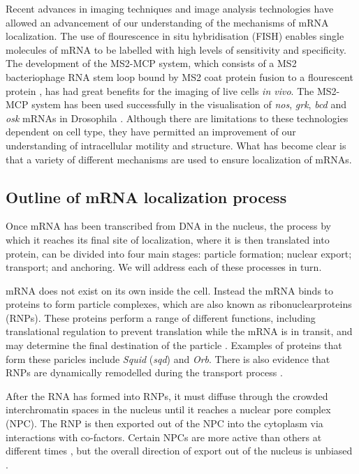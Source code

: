 \documentclass[twocolumn]{biophys}
\begin{document}
Recent advances in imaging techniques and image analysis technologies \citep{jeffery1983localization, bertrand1998localization, hamilton2010particlestats} have allowed an advancement of our understanding of the mechanisms of mRNA localization. 
The use of flourescence in situ hybridisation (FISH) enables single molecules of mRNA to be labelled with high levels of sensitivity and specificity. 
The development of the MS2-MCP system, which consists of a MS2 bacteriophage RNA stem loop bound by MS2 coat protein fusion to a flourescent protein \citep{parton2014subcellular}, has had great benefits for the imaging of live cells \textit{in vivo}.
The MS2-MCP system has been used successfully in the visualisation of \textit{nos}, \textit{grk}, \textit{bcd} and \textit{osk} mRNAs in Drosophila \citep{forrest2003live, jaramillo2008dynamics, weil2006localization, zimyanin2008vivo}.
Although there are limitations to these technologies dependent on cell type, they have permitted an improvement of our understanding of intracellular motility and structure.
What has become clear is that a variety of different mechanisms are used to ensure localization of mRNAs.

\subsection{Outline of mRNA localization process}

Once mRNA has been transcribed from DNA in the nucleus, the process by which it reaches its final site of localization, where it is then translated into protein, can be divided into four main stages: particle formation; nuclear export; transport; and anchoring.
We will address each of these processes in turn.

mRNA does not exist on its own inside the cell.
Instead the mRNA binds to proteins to form particle complexes, which are also known as ribonuclearproteins (RNPs). 
These proteins perform a range of different functions, including translational regulation to prevent translation while the mRNA is in transit, and may determine the final destination of the particle \citep{hamilton2013multidisciplinary}.
Examples of proteins that form these paricles include \textit{Squid} (\textit{sqd}) and \textit{Orb}.
There is also evidence that RNPs are dynamically remodelled during the transport process \citep{weil2012drosophila}.

After the RNA has formed into RNPs, it must diffuse through the crowded interchromatin spaces in the nucleus until it reaches a nuclear pore complex (NPC).
The RNP is then exported out of the NPC into the cytoplasm via interactions with co-factors.
Certain NPCs are more active than others at different times \citep{weil2012drosophila}, but the overall direction of export out of the nucleus is unbiased \citep{wilkie2001drosophila}. 
\end{document}
